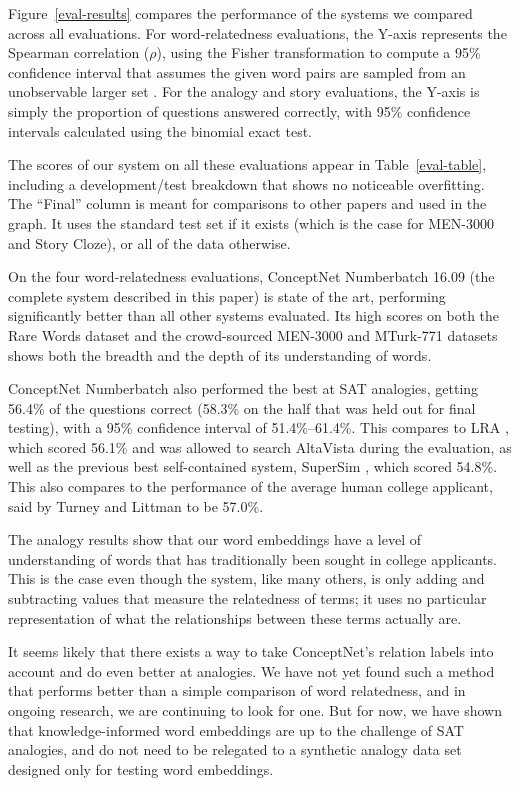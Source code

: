 \documentclass[letterpaper]{article}
\begin{document}
Figure~\ref{eval-results} compares the performance of the systems we compared
across all evaluations. For word-relatedness evaluations, the Y-axis represents
the Spearman correlation ($\rho$), using the Fisher transformation to compute a
95\% confidence interval that assumes the given word pairs are sampled from an
unobservable larger set \cite{bonett2000sample}. For the analogy and story evaluations,
the Y-axis is simply the proportion of questions answered correctly, with 95\%
confidence intervals calculated using the binomial exact test.

The scores of our system on all these evaluations appear in
Table~\ref{eval-table}, including a development/test breakdown that shows no
noticeable overfitting. The ``Final'' column is meant for comparisons to other
papers and used in the graph. It uses the standard test set if it exists (which
is the case for MEN-3000 and Story Cloze), or all of the data
otherwise.

On the four word-relatedness evaluations, ConceptNet Numberbatch 16.09 (the
complete system described in this paper) is state of the art, performing
significantly better than all other systems evaluated. Its high scores on both
the Rare Words dataset and the crowd-sourced MEN-3000 and MTurk-771 datasets
shows both the breadth and the depth of its understanding of words.

ConceptNet Numberbatch also performed the best at SAT analogies, getting 56.4\%
of the questions correct (58.3\% on the half that was held out for final
testing), with a 95\% confidence interval of 51.4\%--61.4\%.
This compares to LRA \cite{turney2005lra}, which scored 56.1\% and was
allowed to search AltaVista during the evaluation, as well as the previous best
self-contained system, SuperSim \cite{turney2013supersim}, which scored 54.8\%.
This also compares to the performance of the average human college applicant,
said by Turney and Littman to be 57.0\%.

The analogy results show that our word embeddings have a level of understanding
of words that has traditionally been sought in college applicants. This is the
case even though the system, like many others, is only adding and subtracting
values that measure the relatedness of terms; it uses no particular
representation of what the relationships between these terms actually are.

It seems likely that there exists a way to take ConceptNet's relation labels
into account and do even better at analogies. We have not yet found such a
method that performs better than a simple comparison of word relatedness, and
in ongoing research, we are continuing to look for one. But for now, we have
shown that knowledge-informed word embeddings are up to the challenge of SAT
analogies, and do not need to be relegated to a synthetic analogy data set
designed only for testing word embeddings.
\end{document}
